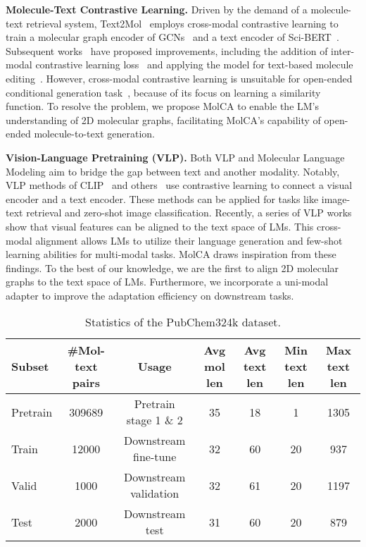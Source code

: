 \documentclass[11pt]{article}
\begin{document}
\textbf{Molecule-Text Contrastive Learning.} Driven by the demand of a molecule-text retrieval system, Text2Mol~\citep{Text2Mol} employs cross-modal contrastive learning to train a molecular graph encoder of GCNs~\cite{GCN} and a text encoder of Sci-BERT~\cite{SciBERT}. Subsequent works~\cite{MoMu, MoleculeSTM, CLAMP} have proposed improvements, including the addition of inter-modal contrastive learning loss~\citep{MoMu} and applying the model for text-based molecule editing~\citep{MoleculeSTM}. However, cross-modal contrastive learning is unsuitable for open-ended conditional generation task~\cite{Flamingo}, because of its focus on learning a similarity function. 
To resolve the problem, we propose MolCA to enable the LM's understanding of 2D molecular graphs, facilitating MolCA's capability of open-ended molecule-to-text generation.

\textbf{Vision-Language Pretraining (VLP).} Both VLP and Molecular Language Modeling aim to bridge the gap between text and another modality. Notably, VLP methods of CLIP~\cite{CLIP} and others~\cite{DeCLIP, FILIP} use contrastive learning to connect a visual encoder and a text encoder. These methods can be applied for tasks like image-text retrieval and zero-shot image classification. Recently, a series of VLP works~\cite{Frozen,LinearMapping, BLIP2, Flamingo} show that visual features can be aligned to the text space of LMs. This cross-modal alignment allows LMs to utilize their language generation and few-shot learning abilities for multi-modal tasks. MolCA draws inspiration from these findings. To the best of our knowledge, we are the first to align 2D molecular graphs to the text space of LMs. Furthermore, we incorporate a uni-modal adapter to improve the adaptation efficiency on downstream tasks.

\begin{table*}[t]
\small
\centering
\begin{tabular}{lcccccc} \toprule
Subset & \#Mol-text pairs & Usage & Avg mol len & Avg text len & Min text len & Max text len \\\midrule
Pretrain & 309689 & Pretrain stage 1 \& 2 & 35 & 18 & 1 & 1305 \\
Train & 12000 & Downstream fine-tune & 32 & 60 & 20 & 937 \\
Valid & 1000 & Downstream validation & 32 & 61 & 20 & 1197 \\
Test & 2000 & Downstream test & 31 & 60 & 20 & 879 \\\bottomrule
\end{tabular}
\caption{Statistics of the PubChem324k dataset.}
\label{tab:PubChem324k_detail}
\end{table*}
\end{document}
